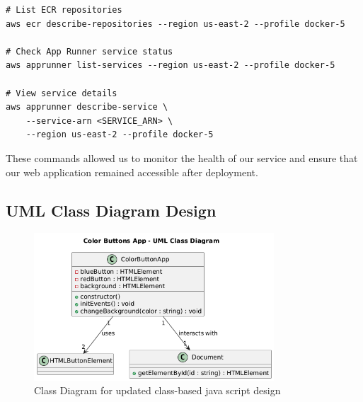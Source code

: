 \begin{verbatim}
# List ECR repositories
aws ecr describe-repositories --region us-east-2 --profile docker-5

# Check App Runner service status
aws apprunner list-services --region us-east-2 --profile docker-5

# View service details
aws apprunner describe-service \
    --service-arn <SERVICE_ARN> \
    --region us-east-2 --profile docker-5
\end{verbatim}

These commands allowed us to monitor the health of our service and ensure that our web application remained accessible after deployment.

\subsection{UML Class Diagram Design}

\begin{figure}[h!]
    \centering
    \includegraphics[width=0.8\textwidth]{png/ClassDiagram_Colorbutton.png}
    \caption{Class Diagram for updated class-based java script design}
    \label{fig:umlclassdiagram}
\end{figure}
